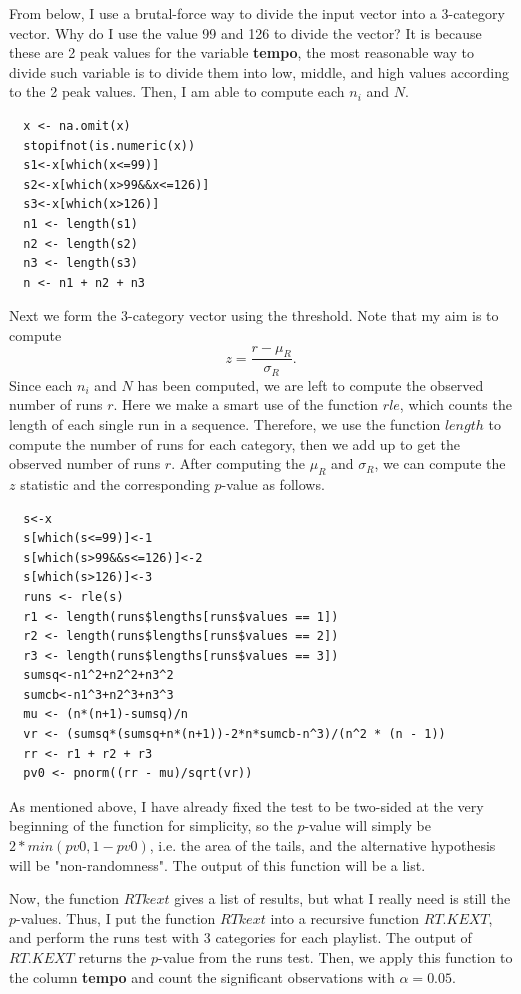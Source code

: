\documentclass[12pt]{article}
\theoremstyle{plain}
\theoremstyle{definition}
\theoremstyle{remark}
\begin{document}
From below, I use a brutal-force way to divide the input vector into a 3-category vector. Why do I use the value 99 and 126 to divide the vector? It is because these are 2 peak values for the variable \textbf{tempo}, the most reasonable way to divide such variable is to divide them into low, middle, and high values according to the 2 peak values. Then, I am able to compute each $n_i$ and $N$. 
\begin{verbatim}
  x <- na.omit(x)
  stopifnot(is.numeric(x))
  s1<-x[which(x<=99)]
  s2<-x[which(x>99&&x<=126)]
  s3<-x[which(x>126)]
  n1 <- length(s1)
  n2 <- length(s2)
  n3 <- length(s3)
  n <- n1 + n2 + n3
\end{verbatim}
Next we form the 3-category vector using the threshold. Note that my aim is to compute $$z=\frac{r-\mu_R}{\sigma_R}.$$ Since each $n_i$ and $N$ has been computed, we are left to compute the observed number of runs $r$. Here we make a smart use of the function $rle$, which counts the length of each single run in a sequence. Therefore, we use the function $length$ to compute the number of runs for each category, then we add up to get the observed number of runs $r$. After computing the $\mu_R$ and $\sigma_R$, we can compute the $z$ statistic and the corresponding $p$-value as follows.
\begin{verbatim}
  s<-x
  s[which(s<=99)]<-1
  s[which(s>99&&s<=126)]<-2
  s[which(s>126)]<-3
  runs <- rle(s)
  r1 <- length(runs$lengths[runs$values == 1])
  r2 <- length(runs$lengths[runs$values == 2])
  r3 <- length(runs$lengths[runs$values == 3])
  sumsq<-n1^2+n2^2+n3^2
  sumcb<-n1^3+n2^3+n3^3
  mu <- (n*(n+1)-sumsq)/n
  vr <- (sumsq*(sumsq+n*(n+1))-2*n*sumcb-n^3)/(n^2 * (n - 1))
  rr <- r1 + r2 + r3
  pv0 <- pnorm((rr - mu)/sqrt(vr))
\end{verbatim}  
As mentioned above, I have already fixed the test to be two-sided at the very beginning of the function for simplicity, so the $p$-value will simply be $2 * min(pv0, 1 - pv0)$, i.e. the area of the tails, and the alternative hypothesis will be "non-randomness". The output of this function will be a list.

Now, the function $RTkext$ gives a list of results, but what I really need is still the $p$-values. Thus, I put the function $RTkext$ into a recursive function $RT.KEXT$, and perform the runs test with 3 categories for each playlist. The output of $RT.KEXT$ returns the $p$-value from the runs test. Then, we apply this function to the column \textbf{tempo} and count the significant observations with $\alpha=0.05$. 
\end{document}
